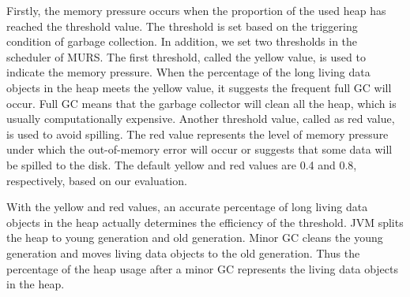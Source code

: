 Firstly, the memory pressure occurs when the proportion of the used heap has reached the threshold value. The threshold is set based on the triggering condition of garbage collection. In addition, we set two thresholds in the scheduler of MURS. The first threshold, called the yellow value, is used to indicate the memory pressure. When the percentage of the long living data objects in the heap meets the yellow value, it suggests the frequent full GC will occur. Full GC means that the garbage collector will clean all the heap, which is usually computationally expensive. Another threshold value, called as red value, is used to avoid spilling. The red value represents the level of memory pressure under which the out-of-memory error will occur or suggests that some data will be spilled to the disk. The default yellow and red values are 0.4 and 0.8, respectively, based on our evaluation. 

With the yellow and red values, an accurate percentage of long living data objects in the heap actually determines the efficiency of the threshold. JVM splits the heap to young generation and old generation. Minor GC cleans the young generation and moves living data objects to the old generation. Thus the percentage of the heap usage after a minor GC represents the living data objects in the heap. 



